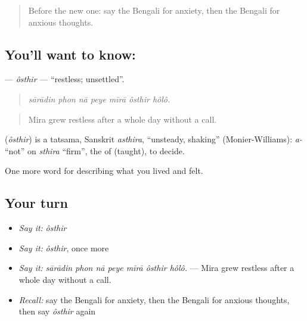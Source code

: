 \begin{quote}
Before the new one: say the Bengali for anxiety, then the Bengali for anxious thoughts.
\end{quote}

\subsection*{You'll want to know: }
\textbf{} — \emph{ôsthir} — \textquotedblleft{}restless; unsettled\textquotedblright{}.

\begin{quote}
      
\end{quote}

\begin{quote}
\emph{sārādin phon nā peye mīrā ôsthir hôlô.}
\end{quote}

\begin{quote}
Mira grew restless after a whole day without a call.
\end{quote}

\begin{cousinweb}
\textbf{} (\emph{ôsthir}) is a tatsama, Sanskrit \emph{asthira}, \textquotedblleft{}unsteady, shaking\textquotedblright{} (Monier-Williams): \emph{a-} \textquotedblleft{}not\textquotedblright{} on \emph{sthira} \textquotedblleft{}firm\textquotedblright{}, the  of   (taught), to decide.
\end{cousinweb}

\begin{grammarlens}[title={What you've built}]
One more word for describing what you lived and felt.
\end{grammarlens}

\subsection*{Your turn}
\begin{itemize}
\raggedright
  \item \emph{Say it:} \emph{ôsthir}
  \item \emph{Say it:} \emph{ôsthir}, once more
  \item \emph{Say it:} \emph{sārādin phon nā peye mīrā ôsthir hôlô.} — Mira grew restless after a whole day without a call.
  \item \emph{Recall:} say the Bengali for anxiety, then the Bengali for anxious thoughts, then say \emph{ôsthir} again
\end{itemize}


